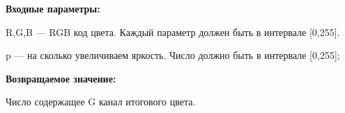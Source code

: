 \textbf{Входные параметры:}  

R,G,B --- RGB код цвета. Каждый параметр должен быть в интервале [0,255].

p --- на сколько увеличиваем яркость. Число должно быть в интервале [0,255];

\textbf{Возвращаемое значение:}

Число содержащее G канал итогового цвета.